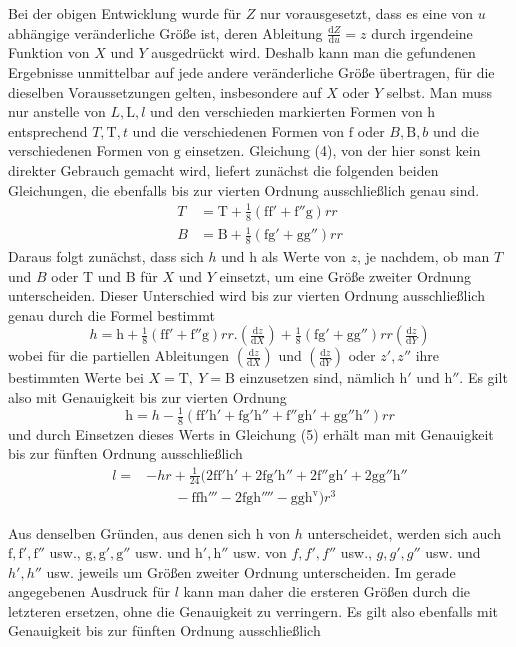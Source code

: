 %
\par\noindent\hspace*{\parindent} Bei der obigen Entwicklung wurde für \(Z\) nur vorausgesetzt, dass es eine von \(u\) abhängige veränderliche Größe ist, deren Ableitung \(\frac{\mathrm{d}Z}{\mathrm{d}u}=z\) durch irgendeine Funktion von \(X\) und \(Y\) ausgedrückt wird. Deshalb kann man die gefundenen Ergebnisse unmittelbar auf jede andere veränderliche Größe übertragen, für die dieselben Voraussetzungen gelten, insbesondere auf \(X\) oder \(Y\) selbst. Man muss nur anstelle von \(L,\mathrm{L},l\) und den verschieden markierten Formen von \(\mathrm{h}\) entsprechend \(T,\mathrm{T},t\) und die verschiedenen Formen von \(\mathrm{f}\) oder \(B,\mathrm{B},b\) und die verschiedenen Formen von \(\mathrm{g}\) einsetzen. Gleichung (4), von der hier sonst kein direkter Gebrauch gemacht wird, liefert zunächst die folgenden beiden Gleichungen, die ebenfalls bis zur vierten Ordnung ausschließlich genau sind.
\[
\begin{aligned}
T&=\mathrm{T}+\tfrac18(\mathrm{ff}'+\mathrm{f}''\mathrm{g})rr\\
B&=\mathrm{B}+\tfrac18(\mathrm{fg}'+\mathrm{gg}'')rr
\end{aligned}
\]
Daraus folgt zunächst, dass sich \(h\) und \(\mathrm{h}\) als Werte von \(z\), je nachdem, ob man \(T\) und \(B\) oder \(\mathrm{T}\) und \(\mathrm{B}\) für \(X\) und \(Y\) einsetzt, um eine Größe zweiter Ordnung unterscheiden. Dieser Unterschied wird bis zur vierten Ordnung ausschließlich genau durch die Formel bestimmt
\[
h=\mathrm{h}+\tfrac18(\mathrm{ff}'+\mathrm{f}''\mathrm{g})rr\mathord{.}(\tfrac{\mathrm{d}z}{\mathrm{d}X})+\tfrac18(\mathrm{fg}'+\mathrm{gg}'')rr(\tfrac{\mathrm{d}z}{\mathrm{d}Y})
\]
wobei für die partiellen Ableitungen \((\frac{\mathrm{d}z}{\mathrm{d}X})\) und \((\frac{\mathrm{d}z}{\mathrm{d}Y})\) oder \(z',z''\) ihre bestimmten Werte bei \(X=\mathrm{T},\ Y=\mathrm{B}\) einzusetzen sind, nämlich \(\mathrm{h}'\) und \(\mathrm{h}''\). Es gilt also mit Genauigkeit bis zur vierten Ordnung
\[
\mathrm{h}=h-\tfrac18(\mathrm{ff'h}'+\mathrm{fg'h}''+\mathrm{f''gh}'+\mathrm{gg''h}'')rr
\]
und durch Einsetzen dieses Werts in Gleichung (5) erhält man mit Genauigkeit bis zur fünften Ordnung ausschließlich
\[
\begin{aligned}
l={}&-hr+\tfrac1{24}(2\mathrm{ff'h}'+2\mathrm{fg'h}''+2\mathrm{f''gh}'+2\mathrm{gg''h}''\\
&\qquad-\mathrm{ffh}'''-2\mathrm{fgh}''''-\mathrm{ggh}^{\mathrm{v}})r^3
\end{aligned}
\]

\indent Aus denselben Gründen, aus denen sich \(\mathrm{h}\) von \(h\) unterscheidet, werden sich auch \(\mathrm{f},\mathrm{f}',\mathrm{f}''\) usw., \(\mathrm{g},\mathrm{g}',\mathrm{g}''\) usw. und \(\mathrm{h}',\mathrm{h}''\) usw. von \(f,f',f''\) usw., \(g,g',g''\) usw. und \(h',h''\) usw. jeweils um Größen zweiter Ordnung unterscheiden. Im gerade angegebenen Ausdruck für \(l\) kann man daher die ersteren Größen durch die letzteren ersetzen, ohne die Genauigkeit zu verringern. Es gilt also ebenfalls mit Genauigkeit bis zur fünften Ordnung ausschließlich
